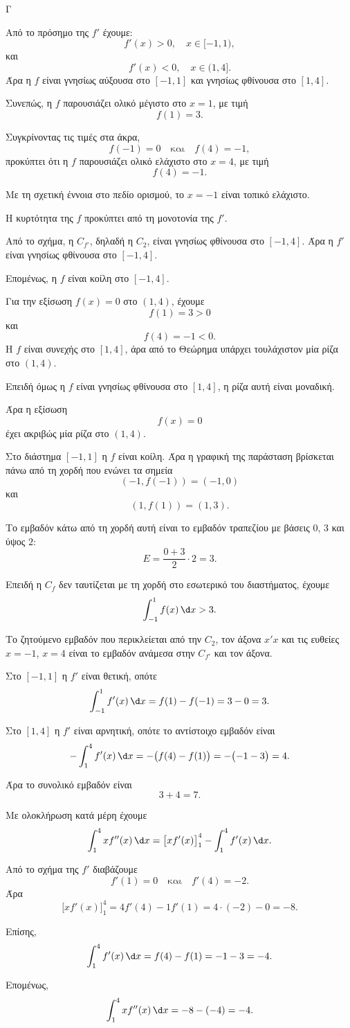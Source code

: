 \begin{thema}{Γ}
\begin{erwthma}
Από το πρόσημο της $f'$ έχουμε:
\[
f'(x)>0,\quad x\in[-1,1),
\]
και
\[
f'(x)<0,\quad x\in(1,4].
\]
Άρα η $f$ είναι γνησίως αύξουσα στο $[-1,1]$ και γνησίως φθίνουσα στο $[1,4]$.

Συνεπώς, η $f$ παρουσιάζει ολικό μέγιστο στο $x=1$, με τιμή
\[
f(1)=3.
\]

Συγκρίνοντας τις τιμές στα άκρα,
\[
f(-1)=0
\quad \text{και}\quad
f(4)=-1,
\]
προκύπτει ότι η $f$ παρουσιάζει ολικό ελάχιστο στο $x=4$, με τιμή
\[
f(4)=-1.
\]

Με τη σχετική έννοια στο πεδίο ορισμού, το $x=-1$ είναι τοπικό ελάχιστο.

\item Η κυρτότητα της $f$ προκύπτει από τη μονοτονία της $f'$.

Από το σχήμα, η $C_{f'}$, δηλαδή η $C_2$, είναι γνησίως φθίνουσα στο $[-1,4]$. Άρα η $f'$ είναι γνησίως φθίνουσα στο $[-1,4]$.

Επομένως, η $f$ είναι κοίλη στο $[-1,4]$.

Για την εξίσωση $f(x)=0$ στο $(1,4)$, έχουμε
\[
f(1)=3>0
\]
και
\[
f(4)=-1<0.
\]
Η $f$ είναι συνεχής στο $[1,4]$, άρα από το Θεώρημα  υπάρχει τουλάχιστον μία ρίζα στο $(1,4)$.

Επειδή όμως η $f$ είναι γνησίως φθίνουσα στο $[1,4]$, η ρίζα αυτή είναι μοναδική.

Άρα η εξίσωση
\[
f(x)=0
\]
έχει ακριβώς μία ρίζα στο $(1,4)$.

\item Στο διάστημα $[-1,1]$ η $f$ είναι κοίλη. Άρα η γραφική της παράσταση βρίσκεται πάνω από τη χορδή που ενώνει τα σημεία
\[
(-1,f(-1))=(-1,0)
\]
και
\[
(1,f(1))=(1,3).
\]

Το εμβαδόν κάτω από τη χορδή αυτή είναι το εμβαδόν τραπεζίου με βάσεις $0$, $3$ και ύψος $2$:
\[
E=\frac{0+3}{2}\cdot 2=3.
\]

Επειδή η $C_f$ δεν ταυτίζεται με τη χορδή στο εσωτερικό του διαστήματος, έχουμε
\[
\int_{-1}^1 f(x)\,\d x>3.
\]

Το ζητούμενο εμβαδόν που περικλείεται από την $C_2$, τον άξονα $x'x$ και τις ευθείες $x=-1$, $x=4$ είναι το εμβαδόν ανάμεσα στην $C_{f'}$ και τον άξονα.

Στο $[-1,1]$ η $f'$ είναι θετική, οπότε
\[
\int_{-1}^1 f'(x)\,\d x=f(1)-f(-1)=3-0=3.
\]

Στο $[1,4]$ η $f'$ είναι αρνητική, οπότε το αντίστοιχο εμβαδόν είναι
\[
-\int_1^4 f'(x)\,\d x
=-\bigl(f(4)-f(1)\bigr)
=-\bigl(-1-3\bigr)=4.
\]

Άρα το συνολικό εμβαδόν είναι
\[
3+4=7.
\]

\item Με ολοκλήρωση κατά μέρη έχουμε
\[
\int_1^4 x f''(x)\,\d x
=\bigl[x f'(x)\bigr]_1^4-\int_1^4 f'(x)\,\d x.
\]

Από το σχήμα της $f'$ διαβάζουμε
\[
f'(1)=0
\quad \text{και}\quad
f'(4)=-2.
\]
Άρα
\[
\bigl[x f'(x)\bigr]_1^4
=4f'(4)-1f'(1)
=4\cdot(-2)-0=-8.
\]

Επίσης,
\[
\int_1^4 f'(x)\,\d x=f(4)-f(1)=-1-3=-4.
\]

Επομένως,
\[
\int_1^4 x f''(x)\,\d x
=-8-(-4)=-4.
\]
\end{erwthma}
\end{thema}



